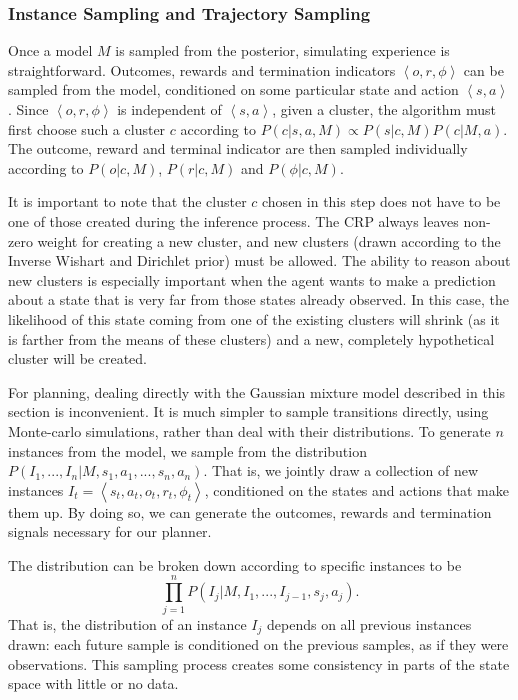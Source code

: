 \subsubsection{Instance Sampling and Trajectory Sampling}

\label{sec:models:roar:traj-sample}

Once a model $M$ is sampled from the  posterior, simulating experience is straightforward. Outcomes, rewards and termination indicators $\left<o,r,\phi\right>$ can be sampled from the model, conditioned on some particular state and action $\left<s,a\right>$. Since $\left<o,r,\phi\right>$ is independent of $\left<s,a\right>$, given a cluster, the algorithm must first choose such a cluster $c$ according to $P(c|s,a,M)\propto P(s|c,M)P(c|M,a)$. The outcome, reward and terminal indicator are then sampled individually according to $P(o|c,M)$, $P(r|c,M)$ and $P(\phi|c,M)$.

It is important to note that the cluster $c$ chosen in this step does not have to be one of those created during the inference process. The CRP always leaves non-zero weight for creating a new cluster, and new clusters (drawn according to the Inverse Wishart and Dirichlet prior) must be allowed. The ability to reason about new clusters is especially important when the agent wants to make a prediction about a state that is very far from those states already observed. In this case, the likelihood of this state coming from one of the existing clusters will shrink (as it is farther from the means of these clusters) and a new, completely hypothetical cluster will be created.

For planning, dealing directly with the Gaussian mixture model described in this section is inconvenient. It is much simpler to sample transitions directly, using Monte-carlo simulations, rather than deal with their distributions. To generate $n$ instances from the model, we sample from the distribution $P(I_1,...,I_n|M,s_1,a_1,...,s_n,a_n)$. That is, we jointly draw a collection of new instances $I_t=\left<s_t,a_t,o_t,r_t,\phi_t\right>$, conditioned on the states and actions that make them up. By doing so, we can generate the outcomes, rewards and termination signals necessary for our planner.

The distribution can be broken down according to specific instances to be $$\prod_{j=1}^n P(I_j|M,I_1,...,I_{j-1},s_j,a_j).$$ That is, the distribution of an instance $I_j$ depends on all previous instances drawn: each future sample is conditioned on the previous samples, as if they were observations. This sampling process creates some consistency in parts of the state space with little or no data.

